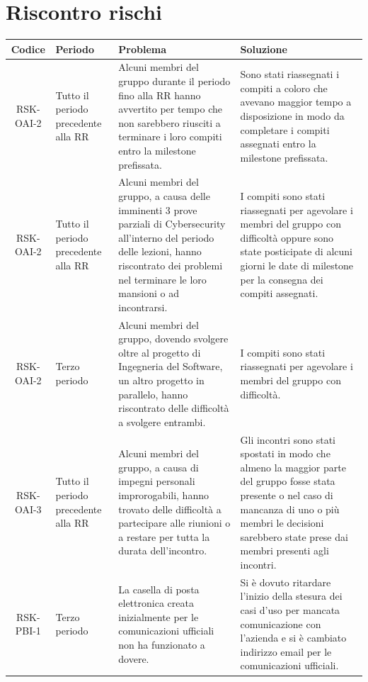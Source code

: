 \appendix
{}

	\section{Riscontro rischi}

		\begin{center}
			\begin{longtable}{|c|p{3cm}|p{4cm}|p{4cm}|}
			\hline
			\rowcolor{lighter-grayer}
			\textbf{Codice} & \textbf{Periodo} & \textbf{Problema} & \textbf{Soluzione} \\
			\hline
			\endfirsthead

			\hline
			RSK-OAI-2 & Tutto il periodo precedente alla RR & Alcuni membri del gruppo durante il periodo fino alla RR hanno avvertito per tempo che non sarebbero riusciti a terminare i loro compiti entro la milestone prefissata. & Sono stati riassegnati i compiti a coloro che avevano maggior tempo a disposizione in modo da completare i compiti assegnati entro la milestone prefissata. \\
			\hline
			\hline
			RSK-OAI-2 & Tutto il periodo precedente alla RR & Alcuni membri del gruppo, a causa delle imminenti 3 prove parziali di Cybersecurity all'interno del periodo delle lezioni, hanno riscontrato dei problemi nel terminare le loro mansioni o ad incontrarsi. & I compiti sono stati riassegnati per agevolare i membri del gruppo con difficoltà oppure sono state posticipate di alcuni giorni le date di milestone per la consegna dei compiti assegnati.  \\
			\hline
			\hline
			RSK-OAI-2 & Terzo periodo & Alcuni membri del gruppo, dovendo svolgere oltre al progetto di Ingegneria del Software, un altro progetto in parallelo, hanno riscontrato delle difficoltà a svolgere entrambi. & I compiti sono stati riassegnati per agevolare i membri del gruppo con difficoltà.  \\
			\hline
			\hline
			RSK-OAI-3 & Tutto il periodo precedente alla RR & Alcuni membri del gruppo, a causa di impegni personali improrogabili, hanno trovato delle difficoltà a partecipare alle riunioni o a restare per tutta la durata dell'incontro. & Gli incontri sono stati spostati in modo che almeno la maggior parte del gruppo fosse stata presente o nel caso di mancanza di uno o più membri le decisioni sarebbero state prese dai membri presenti agli incontri. \\
			\hline
			\hline
			RSK-PBI-1 & Terzo periodo & La casella di posta elettronica creata inizialmente per le comunicazioni ufficiali non ha funzionato a dovere. & Si è dovuto ritardare l'inizio della stesura dei casi d'uso per mancata comunicazione con l'azienda e si è cambiato indirizzo email per le comunicazioni ufficiali. \\

\end{longtable}
\end{center}
